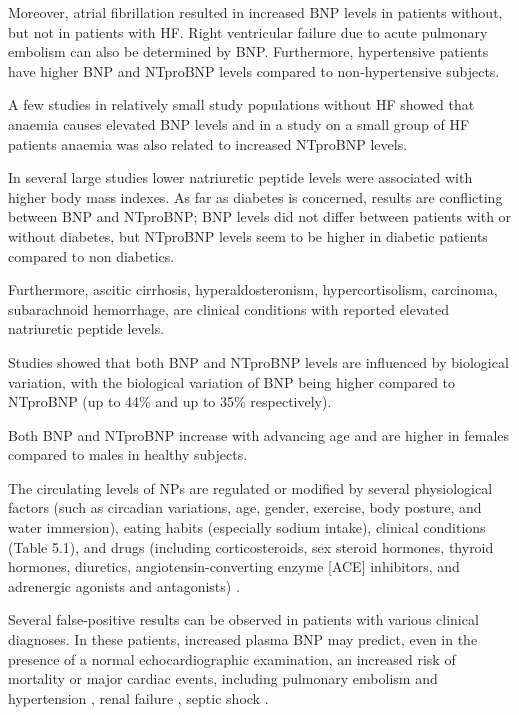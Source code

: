 \documentclass[14pt,a4paper,onecolumn]{extarticle}
\begin{document}
Moreover, atrial fibrillation resulted in increased BNP levels in patients without, but not in patients with HF. \citep{Knudsen2005} Right ventricular failure due to acute pulmonary embolism can also be determined by BNP. \citep{Tulevski2002} Furthermore, hypertensive patients have higher BNP and NTproBNP levels compared to non-hypertensive subjects. \citep{Boomsma2001}

A few studies in relatively small study populations without HF showed that anaemia causes elevated BNP levels \citep{Tsuji2004,Willis2005,Wold2005} and in a study on a small group of HF patients anaemia was also related to increased NTproBNP levels. \citep{Wu2005}

In several large studies lower natriuretic peptide levels were associated with higher body mass indexes. \citep{Das2005,Krauser2005,Mehra2004,Wang2004b} As far as diabetes is concerned, results are conflicting between BNP and NTproBNP; BNP levels did not differ between patients with or without diabetes, \citep{Wu2004} but NTproBNP levels seem to be higher in diabetic patients compared to non diabetics. \citep{Magnusson2004}

Furthermore, ascitic cirrhosis, hyperaldosteronism, hypercortisolism, carcinoma, subarachnoid hemorrhage, \citep{Pfister2004} are clinical conditions with reported elevated natriuretic peptide levels.

Studies showed that both BNP and NTproBNP levels are influenced by biological variation, with the biological variation of BNP being higher compared to NTproBNP (up to 44\% and up to 35\% respectively). \citep{Bruins2004,Wu2003b}

Both BNP and NTproBNP increase with advancing age and are higher in females compared to males in healthy subjects. \citep{Raymond2003}

The circulating levels of NPs are regulated or modified by several physiological factors (such as circadian variations, age, gender, exercise, body posture, and water immersion), eating habits (especially sodium intake), clinical conditions (Table 5.1), and drugs (including corticosteroids, sex steroid hormones, thyroid hormones, diuretics, angiotensin-converting enzyme [ACE] inhibitors, and adrenergic agonists and antagonists) \citep{bib31} \citep{bib32} \citep{bib33} \citep{bib34} \citep{bib35} \citep{bib36}.

Several false-positive results can be observed in patients with various clinical diagnoses. In these patients, increased plasma BNP may predict, even in the presence of a normal echocardiographic examination, an increased risk of mortality or major cardiac events, including pulmonary embolism \citep{121} \citep{123} \citep{bib382} and hypertension \citep{bib383}, renal failure \citep{bib384} \citep{bib385}, septic shock \citep{bib386}.
\end{document}
